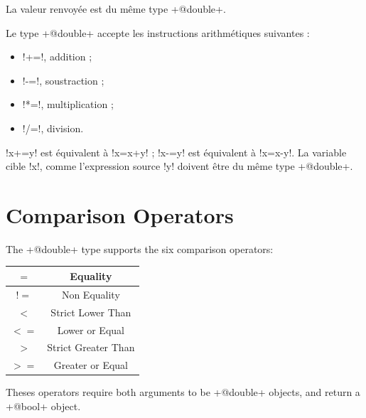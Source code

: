 La valeur renvoyée est du même type  \ggsq+@double+.



Le type \ggsq+@double+ accepte les instructions arithmétiques suivantes :
\begin{itemize}
  \item \ggsq!+=!, addition ;
  \item \ggsq!-=!, soustraction ;
  \item \ggsq!*=!, multiplication ;
  \item \ggsq!/=!, division.
\end{itemize}

\ggsq!x+=y! est équivalent à \ggsq!x=x+y! ; \ggsq!x-=y! est équivalent à \ggsq!x=x-y!.
La variable cible \ggsq!x!, comme l'expression source \ggsq!y! doivent être du même type \ggsq+@double+.







\section{Comparison Operators}

The \ggsq+@double+ type supports the six comparison operators:\newline

\begin{tabular}{|c|c|}
\hline
$=$ & Equality \\
\hline
$!=$ & Non Equality \\
\hline
$<$  & Strict Lower Than \\
\hline
$<=$  & Lower or Equal \\
\hline
$>$  & Strict Greater Than \\
\hline
$>=$  & Greater or Equal \\
\hline
\end{tabular}

Theses operators require both arguments to be \ggsq+@double+ objects, and return a \ggsq+@bool+ object.



